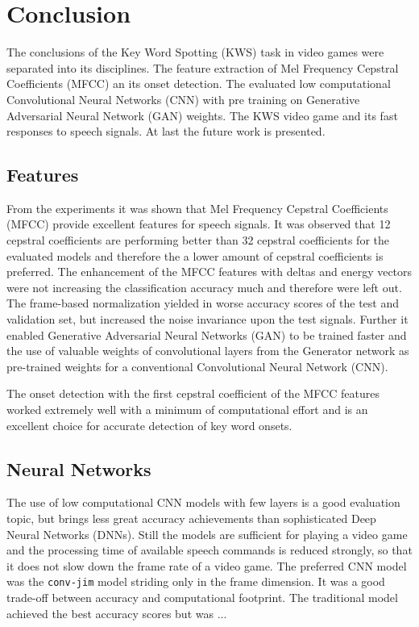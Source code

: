 
\chapter{Conclusion}\label{sec:conclusion}
The conclusions of the Key Word Spotting (KWS) task in video games were separated into its disciplines.
The feature extraction of Mel Frequency Cepstral Coefficients (MFCC) an its onset detection.
The evaluated low computational Convolutional Neural Networks (CNN) with pre training on Generative Adversarial Neural Network (GAN) weights.
The KWS video game and its fast responses to speech signals.
At last the future work is presented.


\section{Features}
\thesisStateNotReady
From the experiments it was shown that Mel Frequency Cepstral Coefficients (MFCC) provide excellent features for speech signals.
It was observed that 12 cepstral coefficients are performing better than 32 cepstral coefficients for the evaluated models and therefore the a lower amount of cepstral coefficients is preferred.
The enhancement of the MFCC features with deltas and energy vectors were not increasing the classification accuracy much and therefore were left out.
The frame-based normalization yielded in worse accuracy scores of the test and validation set, but increased the noise invariance upon the test signals.
Further it enabled Generative Adversarial Neural Networks (GAN) to be trained faster and the use of valuable weights of convolutional layers from the Generator network as pre-trained weights for a conventional Convolutional Neural Network (CNN).

The onset detection with the first cepstral coefficient of the MFCC features worked extremely well with a minimum of computational effort and is an excellent choice for accurate detection of key word onsets.



\section{Neural Networks}
\thesisStateNotReady
The use of low computational CNN models with few layers is a good evaluation topic, but brings less great accuracy achievements than sophisticated Deep Neural Networks (DNNs).
Still the models are sufficient for playing a video game and the processing time of available speech commands is reduced strongly, so that it does not slow down the frame rate of a video game.
The preferred CNN model was the \texttt{conv-jim} model striding only in the frame dimension. It was a good trade-off between accuracy and computational footprint.
The traditional model achieved the best accuracy scores but was ...

